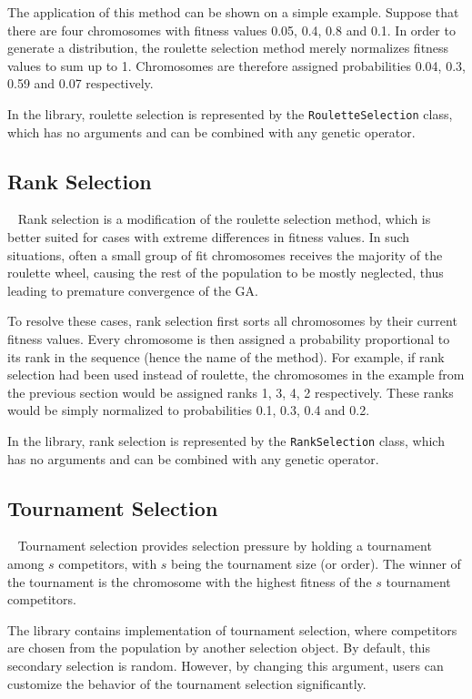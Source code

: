 The application of this method can be shown on a simple example. Suppose that there are four chromosomes with fitness values 0.05, 0.4, 0.8 and 0.1. In order to generate a distribution, the roulette selection method merely normalizes fitness values to sum up to 1. Chromosomes are therefore assigned probabilities 0.04, 0.3, 0.59 and 0.07 respectively.

In the library, roulette selection is represented by the \texttt{RouletteSelection} class, which has no arguments and can be combined with any genetic operator.

\subsection{Rank Selection}~\label{section:rank-selection}
Rank selection is a modification of the roulette selection method, which is better suited for cases with extreme differences in fitness values. In such situations, often a small group of fit chromosomes receives the majority of the roulette wheel, causing the rest of the population to be mostly neglected, thus leading to premature convergence of the GA.

To resolve these cases, rank selection first sorts all chromosomes by their current fitness values. Every chromosome is then assigned a probability proportional to its rank in the sequence (hence the name of the method). For example, if rank selection had been used instead of roulette, the chromosomes in the example from the previous section would be assigned ranks 1, 3, 4, 2 respectively. These ranks would be simply normalized to probabilities 0.1, 0.3, 0.4 and 0.2.

In the library, rank selection is represented by the \texttt{RankSelection} class, which has no arguments and can be combined with any genetic operator.

\subsection{Tournament Selection}~\label{section:tournament-selection}
Tournament selection provides selection pressure by holding a tournament among $s$ competitors, with $s$ being the tournament size (or order). The winner of the tournament is the chromosome with the highest fitness of the $s$ tournament competitors. \cite{GaTournamentSelection}

The library contains implementation of tournament selection, where competitors are chosen from the population by another selection object. By default, this secondary selection is random. However, by changing this argument, users can customize the behavior of the tournament selection significantly.

